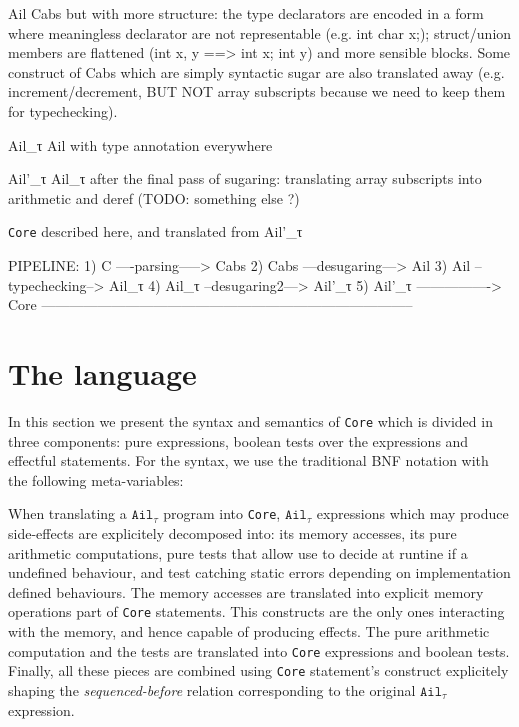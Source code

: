 \documentclass[12pt, a4paper]{article}
\newcommand{\core}{\texttt{Core}}
\newcommand{\ailtau}{$\texttt{Ail}_\tau$}
\begin{document}
Ail    Cabs but with more structure: the type declarators are encoded in a form
       where meaningless declarator are not representable (e.g. int char x;);
       struct/union members are flattened (int x, y ==> int x; int y) and more
       sensible blocks. Some construct of Cabs which are simply syntactic sugar
       are also translated away (e.g. increment/decrement, BUT NOT array
       subscripts because we need to keep them for typechecking).

Ail\_τ    Ail with type annotation everywhere

Ail'\_τ    Ail\_τ after the final pass of sugaring: translating array subscripts
          into arithmetic and deref (TODO: something else ?)

\core{}    described here, and translated from Ail'\_τ


PIPELINE:
  1) C      ----parsing-----> Cabs
  2) Cabs   ---desugaring---> Ail
  3) Ail    --typechecking--> Ail\_τ
  4) Ail\_τ  --desugaring2---> Ail'\_τ
  5) Ail'\_τ ----------------> Core
--------------------------------------------------------------------------------


\newpage
\section{The language}
In this section we present the syntax and semantics of \core{} which is divided in three components:
pure expressions, boolean tests over the expressions and effectful statements.
For the syntax, we use the traditional BNF notation with the following meta-variables:

\ottmetavars

When translating a \ailtau{} program into \core{}, \ailtau{} expressions which may produce side-effects are
explicitely decomposed into: its memory accesses, its pure arithmetic computations, pure tests that allow use
to decide at runtine if a undefined behaviour, and test catching static errors depending on implementation defined
behaviours.
The memory accesses are translated into explicit memory operations part of \core{} statements. This constructs are
the only ones interacting with the memory, and hence capable of producing effects.
The pure arithmetic computation and the tests are translated into \core{} expressions and boolean tests.
Finally, all these pieces are combined using \core{} statement's construct explicitely shaping the \emph{sequenced-before}
relation corresponding to the original \ailtau{} expression.
\end{document}
